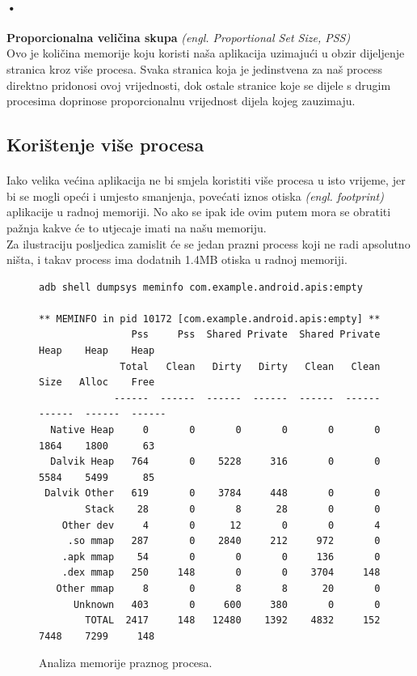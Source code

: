 \documentclass[times, utf8, zavrsni]{fer}
\begin{document}
\paragraph{•}
\textbf{Proporcionalna veličina skupa} \textit{(engl. Proportional Set Size, PSS)}\\
Ovo je količina memorije koju koristi naša aplikacija uzimajući u obzir dijeljenje stranica kroz više procesa. Svaka stranica koja je jedinstvena za naš process direktno pridonosi ovoj vrijednosti, dok ostale stranice koje se dijele s drugim procesima doprinose proporcionalnu vrijednost dijela kojeg zauzimaju.

\subsection{Korištenje više procesa}
\paragraph{}
Iako velika većina aplikacija ne bi smjela koristiti više procesa u isto vrijeme, jer bi se mogli opeći i umjesto smanjenja, povećati iznos otiska \textit{(engl. footprint)} aplikacije u radnoj memoriji. No ako se ipak ide ovim putem mora se obratiti pažnja kakve će to utjecaje imati na našu memoriju.\\

Za ilustraciju posljedica zamislit će se jedan prazni process koji ne radi apsolutno ništa, i takav process ima dodatnih 1.4MB otiska u radnoj memoriji.

\begin{figure}[ht!]
\centering
\begingroup
    \fontsize{8pt}{12pt}\selectfont
		\begin{verbatim}
adb shell dumpsys meminfo com.example.android.apis:empty

** MEMINFO in pid 10172 [com.example.android.apis:empty] **
                Pss     Pss  Shared Private  Shared Private    Heap    Heap    Heap
              Total   Clean   Dirty   Dirty   Clean   Clean    Size   Alloc    Free
             ------  ------  ------  ------  ------  ------  ------  ------  ------
  Native Heap     0       0       0       0       0       0    1864    1800      63
  Dalvik Heap   764       0    5228     316       0       0    5584    5499      85
 Dalvik Other   619       0    3784     448       0       0
        Stack    28       0       8      28       0       0
    Other dev     4       0      12       0       0       4
     .so mmap   287       0    2840     212     972       0
    .apk mmap    54       0       0       0     136       0
    .dex mmap   250     148       0       0    3704     148
   Other mmap     8       0       8       8      20       0
      Unknown   403       0     600     380       0       0
        TOTAL  2417     148   12480    1392    4832     152    7448    7299     148
		\end{verbatim}
\endgroup
\caption{Analiza memorije praznog procesa.}
\label{overflow}
\end{figure}
\end{document}
